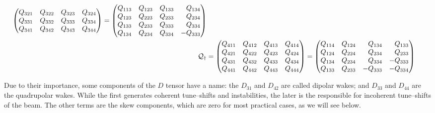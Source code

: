 \begin{apendicesenv}
\begin{align}
\begin{pmatrix*}[r]
                                   Q_{321} & Q_{322} & Q_{323} & Q_{324} \\
                                   Q_{331} & Q_{332} & Q_{333} & Q_{334} \\
                                   Q_{341} & Q_{342} & Q_{343} & Q_{344}
               \end{pmatrix*} =
               \begin{pmatrix*}[r] Q_{113} & Q_{123} & Q_{133} & Q_{134} \\
                                   Q_{123} & Q_{223} & Q_{233} & Q_{234} \\
                                   Q_{133} & Q_{233} & Q_{333} & Q_{334} \\
                                   Q_{134} & Q_{234} & Q_{334} & -Q_{333}
               \end{pmatrix*}\\
		\tensor{Q_y}&= \begin{pmatrix*}[r] Q_{411} & Q_{412} & Q_{413} & Q_{414} \\
                                   Q_{421} & Q_{422} & Q_{423} & Q_{424} \\
                                   Q_{431} & Q_{432} & Q_{433} & Q_{434} \\
                                   Q_{441} & Q_{442} & Q_{443} & Q_{444}
               \end{pmatrix*} =
               \begin{pmatrix*}[r] Q_{114} & Q_{124} & Q_{134} & Q_{133} \\
                                   Q_{124} & Q_{224} & Q_{234} & Q_{233} \\
                                   Q_{134} & Q_{234} & Q_{334} & -Q_{333} \\
                                   Q_{133} & Q_{233} &-Q_{333} & -Q_{334}
               \end{pmatrix*}\\
    \end{align}



    Due to their importance, some components of the $D$ tensor have a name: the $D_{31}$ and $D_{42}$ are called dipolar wakes; and $D_{33}$ and $D_{44}$ are the quadrupolar wakes. While the first generates coherent tune--shifts and instabilities, the later is the responsible for incoherent tune--shifts of the beam. The other terms are the skew components, which are zero for most practical cases, as we will see below.


\end{apendicesenv}
